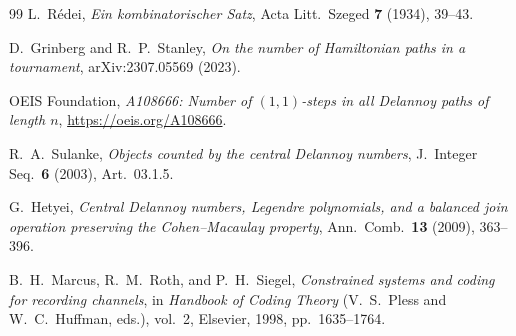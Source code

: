 \documentclass[11pt]{amsart}
\theoremstyle{definition}
\begin{document}
\begin{thebibliography}{99}
 L.~R\'edei, \emph{Ein kombinatorischer Satz}, Acta Litt.\ Szeged \textbf{7} (1934), 39--43.

 D.~Grinberg and R.~P.~Stanley, \emph{On the number of Hamiltonian paths in a tournament}, arXiv:2307.05569 (2023).

 OEIS Foundation, \emph{A108666: Number of $(1,1)$-steps in all Delannoy paths of length $n$}, \url{https://oeis.org/A108666}.

 R.~A.~Sulanke, \emph{Objects counted by the central Delannoy numbers}, J.\ Integer Seq.\ \textbf{6} (2003), Art.~03.1.5.

 G.~Hetyei, \emph{Central Delannoy numbers, Legendre polynomials, and a balanced join operation preserving the Cohen--Macaulay property}, Ann.\ Comb.\ \textbf{13} (2009), 363--396.

 B.~H.~Marcus, R.~M.~Roth, and P.~H.~Siegel, \emph{Constrained systems and coding for recording channels}, in \emph{Handbook of Coding Theory} (V.~S.~Pless and W.~C.~Huffman, eds.), vol.~2, Elsevier, 1998, pp.~1635--1764.
\end{thebibliography}
\end{document}

